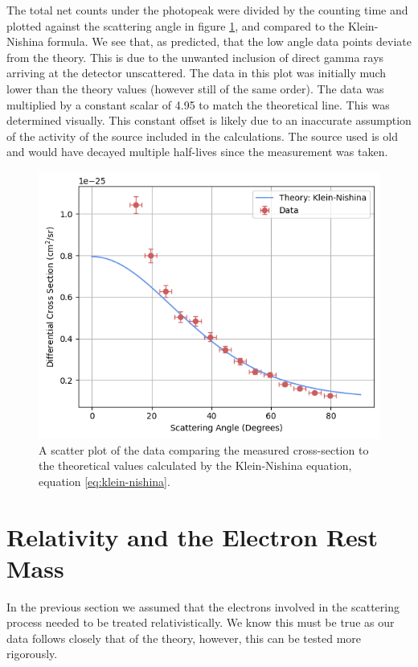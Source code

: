 \documentclass[%
reprint,
amsmath,amssymb,
aps,
]{revtex4-2}
\begin{document}
			The total net counts under the photopeak were divided by the counting time and plotted against the scattering angle in figure \ref{fig:crossSectionPlot}, and compared to the Klein-Nishina formula. We see that, as predicted, that the low angle data points deviate from the theory. This is due to the unwanted inclusion of direct gamma rays arriving at the detector unscattered. The data in this plot was initially much lower than the theory values (however still of the same order). The data was multiplied by a constant scalar of 4.95 to match the theoretical line. This was determined visually. This constant offset is likely due to an inaccurate assumption of the activity of the source included in the calculations. The source used is old and would have decayed multiple half-lives since the measurement was taken.
			
			\begin{figure}
				\includegraphics[width=0.85\columnwidth]{crossSectionPlot.png}
				\caption{\label{fig:crossSectionPlot}A scatter plot of the data comparing the measured cross-section to the theoretical values calculated by the Klein-Nishina equation, equation \ref{eq:klein-nishina}.}
			\end{figure}
		
	\section{Relativity and the Electron Rest Mass}
		
		In the previous section we assumed that the electrons involved in the scattering process needed to be treated relativistically. We know this must be true as our data follows closely that of the theory, however, this can be tested more rigorously.		
		
\end{document}
